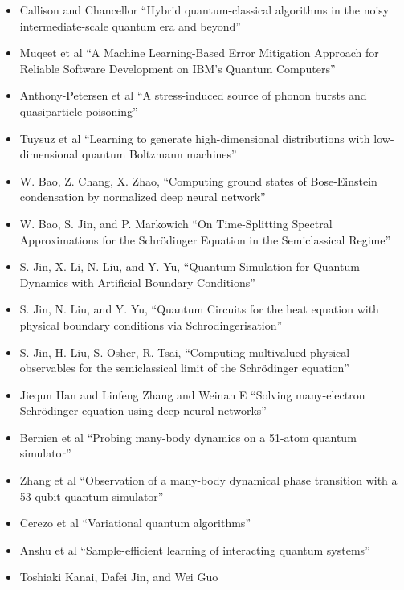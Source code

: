 \documentclass[]{article}
\begin{document}
\begin{itemize}
\item Callison and Chancellor\cite{callison2022hybrid} ``Hybrid quantum-classical algorithms in the noisy intermediate-scale quantum era and beyond''
\item Muqeet et al\cite{muqeet2024machine}
``A Machine Learning-Based Error Mitigation Approach for Reliable Software Development on IBM’s Quantum Computers''
\item Anthony-Petersen et al\cite{anthony2024stress}
``A stress-induced source of phonon bursts and quasiparticle poisoning''
\item Tuysuz et al\cite{tuysuz2024learning}
  ``Learning to generate high-dimensional distributions with low-dimensional quantum Boltzmann machines''
\item W. Bao, Z. Chang, X. Zhao\cite{BAO2025113486}, ``Computing ground states of Bose-Einstein condensation by normalized deep neural network''
\item W. Bao, S. Jin, and P. Markowich\cite{BAO2002487}
``On Time-Splitting Spectral Approximations for the Schrödinger Equation in the Semiclassical Regime''
\item S. Jin, X. Li, N. Liu, and Y. Yu\cite{doi:10.1137/23M1563451},
 ``Quantum Simulation for Quantum Dynamics with Artificial Boundary 
Conditions''
\item S. Jin, N. Liu, and Y. Yu\cite{jin2024quantum}, ``Quantum Circuits for the heat equation with physical boundary conditions via Schrodingerisation''
\item S. Jin, H. Liu, S. Osher, R. Tsai\cite{jin2005computing}, ``Computing multivalued physical observables for the semiclassical limit of the Schr{\"o}dinger equation''
\item
Jiequn Han and Linfeng Zhang and Weinan E\cite{HAN2019108929}
``Solving many-electron Schrödinger equation using deep neural networks''
\item
Bernien et al\cite{bernien2017probing}
``Probing many-body dynamics on a 51-atom quantum simulator''
\item
Zhang et al\cite{zhang2017observation}
``Observation of a many-body dynamical phase transition with a 53-qubit quantum simulator''
\item 
Cerezo et al\cite{cerezo2021variational} ``Variational quantum algorithms''
\item
Anshu et al\cite{anshu2021sample}
``Sample-efficient learning of interacting quantum systems''
\item
Toshiaki Kanai, Dafei Jin, and Wei Guo\cite{PhysRevLett.132.250603}

\end{itemize}
\end{document}
